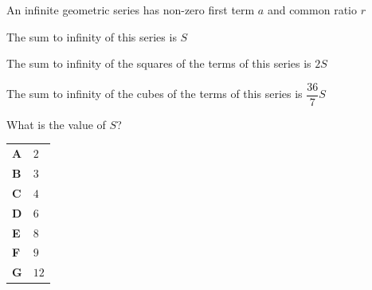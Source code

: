 \documentclass[11pt,a4paper]{article}
\begin{document}
\thispagestyle{djspaper}
\djsFrontMatter
\thispagestyle{djspaper}
\vspace*{8pt}
\begin{enumerate}[label=\textbf{\arabic*.},leftmargin=*,itemsep=0pt,start=1]
An infinite geometric series has non-zero first term $a$ and common ratio $r$

The sum to infinity of this series is $S$

The sum to infinity of the squares of the terms of this series is $2S$

The sum to infinity of the cubes of the terms of this series is $\dfrac{36}{7}S$

What is the value of $S$?

\par\vspace*{12pt}
\begin{tabularx}{\linewidth}{@{}>{\bfseries}l Y@{}}
A &
$2$
\\[0.8em]
B &
$3$
\\[0.8em]
C &
$4$
\\[0.8em]
D &
$6$
\\[0.8em]
E &
$8$
\\[0.8em]
F &
$9$
\\[0.8em]
G &
$12$
\\
\end{tabularx}
\end{enumerate}
\clearpage
\thispagestyle{djspaper}
\vspace*{8pt}
\end{document}
